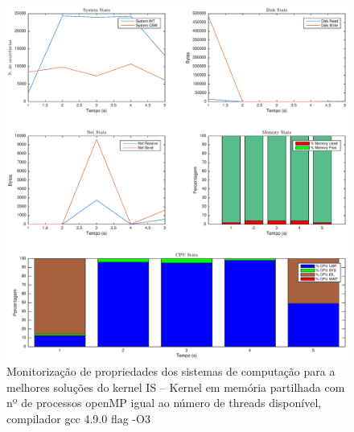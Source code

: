\documentclass[conference,compsoc]{IEEEtran}
\begin{document}
 \begin{figure}
\centering
\includegraphics[width=1\textwidth]{EPS/DSTAT/IS_OMP_24_GCC.eps}
\caption{Monitorização de propriedades dos sistemas de computação para a melhores soluções do kernel IS -- Kernel em memória partilhada com nº de processos openMP igual ao número de threads disponível, compilador gcc 4.9.0 flag -O3}
\label{dstat_is}
\end{figure}
\end{document}
